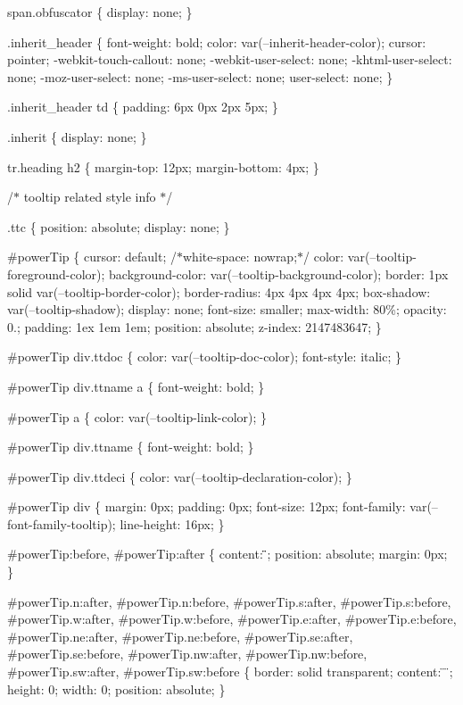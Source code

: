 span.\+obfuscator \{ display\+: none; \}

.inherit\+\_\+header \{ font-\/weight\+: bold; color\+: var(--inherit-\/header-\/color); cursor\+: pointer; -\/webkit-\/touch-\/callout\+: none; -\/webkit-\/user-\/select\+: none; -\/khtml-\/user-\/select\+: none; -\/moz-\/user-\/select\+: none; -\/ms-\/user-\/select\+: none; user-\/select\+: none; \}

.inherit\+\_\+header td \{ padding\+: 6px 0px 2px 5px; \}

.inherit \{ display\+: none; \}

tr.\+heading h2 \{ margin-\/top\+: 12px; margin-\/bottom\+: 4px; \}

/\texorpdfstring{$\ast$}{*} tooltip related style info \texorpdfstring{$\ast$}{*}/

.ttc \{ position\+: absolute; display\+: none; \}

\#power\+Tip \{ cursor\+: default; /\texorpdfstring{$\ast$}{*}white-\/space\+: nowrap;\texorpdfstring{$\ast$}{*}/ color\+: var(--tooltip-\/foreground-\/color); background-\/color\+: var(--tooltip-\/background-\/color); border\+: 1px solid var(--tooltip-\/border-\/color); border-\/radius\+: 4px 4px 4px 4px; box-\/shadow\+: var(--tooltip-\/shadow); display\+: none; font-\/size\+: smaller; max-\/width\+: 80\%; opacity\+: 0.; padding\+: 1ex 1em 1em; position\+: absolute; z-\/index\+: 2147483647; \}

\#power\+Tip div.\+ttdoc \{ color\+: var(--tooltip-\/doc-\/color); font-\/style\+: italic; \}

\#power\+Tip div.\+ttname a \{ font-\/weight\+: bold; \}

\#power\+Tip a \{ color\+: var(--tooltip-\/link-\/color); \}

\#power\+Tip div.\+ttname \{ font-\/weight\+: bold; \}

\#power\+Tip div.\+ttdeci \{ color\+: var(--tooltip-\/declaration-\/color); \}

\#power\+Tip div \{ margin\+: 0px; padding\+: 0px; font-\/size\+: 12px; font-\/family\+: var(--font-\/family-\/tooltip); line-\/height\+: 16px; \}

\#power\+Tip\+:before, \#power\+Tip\+:after \{ content\+: \"{}\"{}; position\+: absolute; margin\+: 0px; \}

\#power\+Tip.\+n\+:after, \#power\+Tip.\+n\+:before, \#power\+Tip.\+s\+:after, \#power\+Tip.\+s\+:before, \#power\+Tip.\+w\+:after, \#power\+Tip.\+w\+:before, \#power\+Tip.\+e\+:after, \#power\+Tip.\+e\+:before, \#power\+Tip.\+ne\+:after, \#power\+Tip.\+ne\+:before, \#power\+Tip.\+se\+:after, \#power\+Tip.\+se\+:before, \#power\+Tip.\+nw\+:after, \#power\+Tip.\+nw\+:before, \#power\+Tip.\+sw\+:after, \#power\+Tip.\+sw\+:before \{ border\+: solid transparent; content\+: \"{} \"{}; height\+: 0; width\+: 0; position\+: absolute; \}

